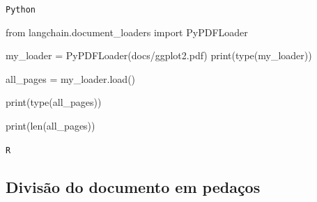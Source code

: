 \documentclass[
  letterpaper,
  DIV=11,
  numbers=noendperiod]{scrartcl}
\newenvironment{Shaded}{\begin{snugshade}}{\end{snugshade}}
\newcommand{\BuiltInTok}[1]{\textcolor[rgb]{0.00,0.23,0.31}{#1}}
\newcommand{\CommentTok}[1]{\textcolor[rgb]{0.37,0.37,0.37}{#1}}
\newcommand{\DecValTok}[1]{\textcolor[rgb]{0.68,0.00,0.00}{#1}}
\newcommand{\FunctionTok}[1]{\textcolor[rgb]{0.28,0.35,0.67}{#1}}
\newcommand{\ImportTok}[1]{\textcolor[rgb]{0.00,0.46,0.62}{#1}}
\newcommand{\NormalTok}[1]{\textcolor[rgb]{0.00,0.23,0.31}{#1}}
\newcommand{\OperatorTok}[1]{\textcolor[rgb]{0.37,0.37,0.37}{#1}}
\newcommand{\OtherTok}[1]{\textcolor[rgb]{0.00,0.23,0.31}{#1}}
\newcommand{\SpecialCharTok}[1]{\textcolor[rgb]{0.37,0.37,0.37}{#1}}
\newcommand{\StringTok}[1]{\textcolor[rgb]{0.13,0.47,0.30}{#1}}
\begin{document}
\begin{codelisting}

\caption{\texttt{Python}}

\begin{Shaded}
\begin{Highlighting}[]
\ImportTok{from}\NormalTok{ langchain.document\_loaders }\ImportTok{import}\NormalTok{ PyPDFLoader}

\NormalTok{my\_loader }\OperatorTok{=}\NormalTok{ PyPDFLoader(}\StringTok{\textquotesingle{}docs/ggplot2.pdf\textquotesingle{}}\NormalTok{)}
\BuiltInTok{print}\NormalTok{(}\BuiltInTok{type}\NormalTok{(my\_loader))}

\NormalTok{all\_pages }\OperatorTok{=}\NormalTok{ my\_loader.load()}

\BuiltInTok{print}\NormalTok{(}\BuiltInTok{type}\NormalTok{(all\_pages)) }

\BuiltInTok{print}\NormalTok{(}\BuiltInTok{len}\NormalTok{(all\_pages))}
\end{Highlighting}
\end{Shaded}

\end{codelisting}

\begin{codelisting}

\caption{\texttt{R}}

\begin{Shaded}
\end{Shaded}

\end{codelisting}

\hypertarget{divisuxe3o-do-documento-em-pedauxe7os}{%
\subsection{Divisão do documento em
pedaços}\label{divisuxe3o-do-documento-em-pedauxe7os}}
\end{document}
